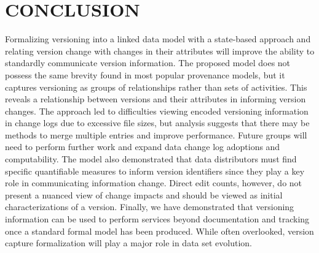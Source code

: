 \chapter{CONCLUSION}

Formalizing versioning into a linked data model with a state-based approach and relating version change with changes in their attributes will improve the ability to standardly communicate version information.
The proposed model does not possess the same brevity found in most popular provenance models, but it captures versioning as groups of relationships rather than sets of activities.
This reveals a relationship between versions and their attributes in informing version changes.
The approach led to difficulties viewing encoded versioning information in change logs due to excessive file sizes, but analysis suggests that there may be methods to merge multiple entries and improve performance.
Future groups will need to perform further work and expand data change log adoptions and computability.
The model also demonstrated that data distributors must find specific quantifiable measures to inform version identifiers since they play a key role in communicating information change.
Direct edit counts, however, do not present a nuanced view of change impacts and should be viewed as initial characterizations of a version.
Finally, we have demonstrated that versioning information can be used to perform services beyond documentation and tracking once a standard formal model has been produced.
While often overlooked, version capture formalization will play a major role in data set evolution.